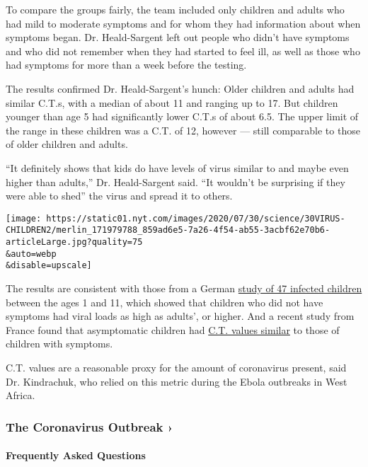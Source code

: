 To compare the groups fairly, the team included only children and adults
who had mild to moderate symptoms and for whom they had information
about when symptoms began. Dr. Heald-Sargent left out people who didn't
have symptoms and who did not remember when they had started to feel
ill, as well as those who had symptoms for more than a week before the
testing.

The results confirmed Dr. Heald-Sargent's hunch: Older children and
adults had similar C.T.s, with a median of about 11 and ranging up to
17. But children younger than age 5 had significantly lower C.T.s of
about 6.5. The upper limit of the range in these children was a C.T. of
12, however --- still comparable to those of older children and adults.

``It definitely shows that kids do have levels of virus similar to and
maybe even higher than adults,'' Dr. Heald-Sargent said. ``It wouldn't
be surprising if they were able to shed'' the virus and spread it to
others.

\texttt{[image: https://static01.nyt.com/images/2020/07/30/science/30VIRUS-CHILDREN2/merlin\_171979788\_859ad6e5-7a26-4f54-ab55-3acbf62e70b6-articleLarge.jpg?quality=75\\\&auto=webp\\\&disable=upscale]}

The results are consistent with those from a German
\href{https://www.nytimes.com/2020/05/05/health/coronavirus-children-transmission-school.html}{study
of 47 infected children} between the ages 1 and 11, which showed that
children who did not have symptoms had viral loads as high as adults',
or higher. And a recent study from France found that asymptomatic
children had
\href{https://academic.oup.com/cid/article/doi/10.1093/cid/ciaa1044/5876373}{C.T.
values similar} to those of children with symptoms.

C.T. values are a reasonable proxy for the amount of coronavirus
present, said Dr. Kindrachuk, who relied on this metric during the Ebola
outbreaks in West Africa.

\href{https://www.nytimes.com/news-event/coronavirus?action=click\&pgtype=Article\&state=default\&region=MAIN_CONTENT_3\&context=storylines_faq}{}

\hypertarget{the-coronavirus-outbreak-}{%
\subsubsection{The Coronavirus Outbreak
›}\label{the-coronavirus-outbreak-}}

\hypertarget{frequently-asked-questions}{%
\paragraph{Frequently Asked
Questions}\label{frequently-asked-questions}}

